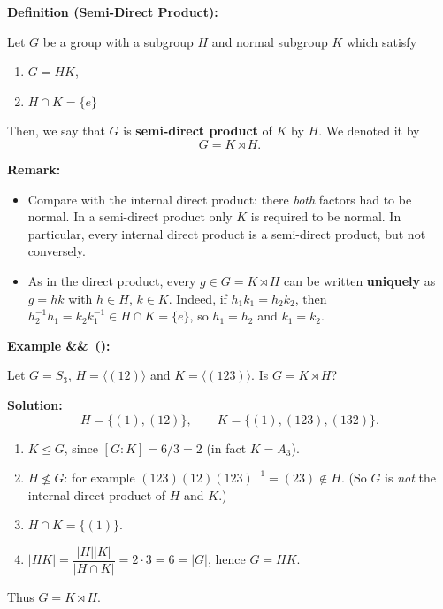 \documentclass[11pt,a4paper]{article}
\newenvironment{definition}[1]{
	\begin{definitionbox}
		\textbf{\color{primaryColor}Definition (#1):} 
	}{
	\end{definitionbox}
}
\newcounter{examplecnt}[section]
\newenvironment{example}[1][]{
	\stepcounter{examplecnt}
	\begin{examplebox}
		\textbf{\color{exampleColor}Example \arabic{examplecnt}\ifx&#1&\else\ (#1)\fi:} 
	}{
	\end{examplebox}
}
\newenvironment{remark}{
	\begin{remarkbox}
		\textbf{\color{remarkColor}Remark:} 
	}{
	\end{remarkbox}
}
\begin{document}
	\begin{definition}{Semi-Direct Product}
		Let $G$ be a group with a subgroup $H$ and normal subgroup $K$ which satisfy
		\begin{enumerate}
			\item $G = HK$,
			\item $H \cap K = \{e\}$
		\end{enumerate}
		Then, we say that $G$ is \textbf{semi-direct product} of $K$ by $H$. We denoted it by
		\[
		G = K \rtimes H.
		\]
	\end{definition}
	
	\begin{remark}
		\begin{itemize}
			\item Compare with the internal direct product: there \emph{both} factors had to be normal. In a semi-direct product only $K$ is required to be normal. In particular, every internal direct product is a semi-direct product, but not conversely.
			\item As in the direct product, every $g \in G = K \rtimes H$ can be written \textbf{uniquely} as $g = hk$ with $h \in H$, $k \in K$. Indeed, if $h_1 k_1 = h_2 k_2$, then $h_2^{-1} h_1 = k_2 k_1^{-1} \in H \cap K = \{e\}$, so $h_1 = h_2$ and $k_1 = k_2$.
		\end{itemize}
	\end{remark}
	
	\begin{example}
		Let $G = S_3$, $H = \langle (12) \rangle$ and $K = \langle (123) \rangle$. Is $G = K \rtimes H$?
		
		\vspace{0.5em}
		\noindent \textbf{Solution:}
		\[
		H = \{(1), (12)\}, \qquad K = \{(1), (123), (132)\}.
		\]
		\begin{enumerate}
			\item $K \trianglelefteq G$, since $[G : K] = 6/3 = 2$ (in fact $K = A_3$). 
			\item $H \ntrianglelefteq G$: for example $(123)(12)(123)^{-1} = (23) \notin H$. (So $G$ is \emph{not} the internal direct product of $H$ and $K$.)
			\item $H \cap K = \{(1)\}$.
			\item $|HK| = \dfrac{|H||K|}{|H \cap K|} = 2 \cdot 3 = 6 = |G|$, hence $G = HK$.
		\end{enumerate}
		Thus $G = K \rtimes H$.
	\end{example}
	
\end{document}
